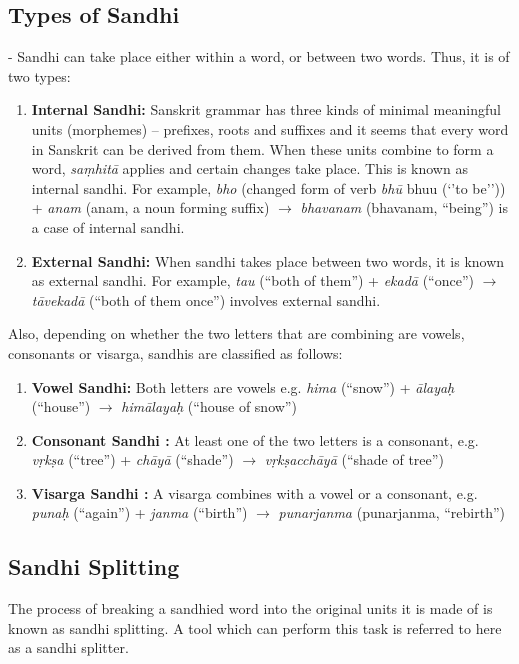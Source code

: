 \documentclass[11pt]{article}
\begin{document}
\subsection{Types of Sandhi} - Sandhi can take place either within a word, or between two words. Thus, it is of two types:
\begin{enumerate}
\item \textbf{Internal Sandhi:} Sanskrit grammar has three kinds of minimal meaningful units (morphemes) – prefixes, roots and suffixes and it seems that every word in Sanskrit can be derived from them. When these units combine to form a word, \textit{saṃhitā} applies and certain changes take place. This is known as internal sandhi.
For example, \textit{ bho} (changed form of verb \textit{bhū} bhuu (‘’to be’’)) + \textit{anam} (anam, a noun forming suffix) $\rightarrow$ \textit{bhavanam }(bhavanam, “being”) is a case of internal sandhi.

\item \textbf{External Sandhi:}
When sandhi takes place between two words, it is known as external sandhi. For example,
\textit{tau} (``both of them'') + \textit{ekadā} (``once'') $\rightarrow$ \textit{tāvekadā} (``both of them once'') involves external sandhi.

\end{enumerate}



    
Also, depending on whether the two letters that are combining are vowels, consonants or visarga, sandhis are classified as follows:
\begin{enumerate}
\item \textbf{Vowel Sandhi:} Both letters are vowels e.g. \textit{ hima} (``snow'') + \textit{ ālayaḥ} (``house'') $\rightarrow$ \textit{himālayaḥ} (``house of snow'')
\item \textbf{Consonant Sandhi :}  At least one of the two letters is a consonant, e.g. \textit{vṛkṣa} (``tree'') + \textit{chāyā }(``shade'') $\rightarrow$ \textit{vṛkṣacchāyā} (``shade of tree'') 
\item \textbf{Visarga Sandhi :} A visarga combines with a vowel or a consonant, e.g.  \textit{ punaḥ }(``again'') + \textit{janma }(``birth'') $\rightarrow$ \textit{punarjanma} (punarjanma, “rebirth”)

\end{enumerate}


\subsection{Sandhi Splitting}
The process of breaking a sandhied word into the original units it is made of is known as sandhi splitting. A tool which can perform this task is referred to here as a sandhi splitter.
\end{document}
